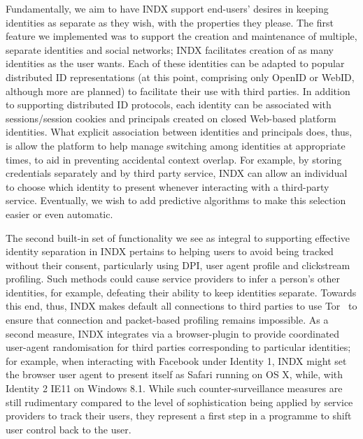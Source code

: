 \documentclass{sig-alternate}
\begin{document}
Fundamentally, we aim to have INDX support end-users' desires in keeping identities as separate as they wish, with the properties they please.  The first feature we implemented was to support the creation and maintenance of multiple, separate identities and social networks; INDX facilitates creation of as many  identities as the user wants.  Each of these identities can be adapted to popular distributed ID representations (at this point, comprising only OpenID or WebID, although more are planned) to facilitate their use with third parties.  In addition to supporting distributed ID protocols, each identity can be associated with sessions/session cookies and principals created on closed Web-based platform identities.   What explicit association between identities and principals does, thus, is allow the platform to help manage switching among identities at appropriate times, to aid in preventing accidental context overlap.  For example, by storing credentials separately and by third party service, INDX can allow an individual to choose which identity to present whenever interacting with a third-party service. Eventually, we wish to add predictive algorithms to make this selection easier or even automatic.

The second built-in set of functionality we see as integral to supporting effective identity separation in INDX pertains to helping users to avoid being tracked without their consent, particularly using DPI, user agent profile and clickstream profiling.  Such methods could cause service providers to infer a person's other identities, for example, defeating their ability to keep identities separate.  Towards this end, thus, INDX makes default all connections to third parties to use Tor~\cite{tor} to ensure that connection and packet-based profiling remains impossible.  As a second measure, INDX integrates via a browser-plugin to provide coordinated user-agent randomisation for third parties corresponding to particular identities; for example, when interacting with Facebook under Identity 1, INDX might set the browser user agent to present itself as Safari running on OS X, while, with Identity 2 IE11 on Windows 8.1.  While such counter-surveillance measures are still rudimentary compared to the level of sophistication being applied by service providers to track their users, they represent a first step in a programme to shift user control back to the user.

% 
\end{document}
